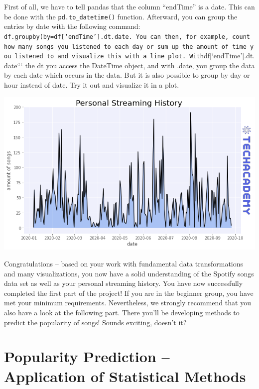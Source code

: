 \documentclass[
  11pt,
]{book}
\newenvironment{tipsp}[1]
  {
  \begin{itemize}
  \footnotesize
  \renewcommand{\labelitemi}{
    \raisebox{-.7\height}[0pt][0pt]{
      {\setkeys{Gin}{width=3em,keepaspectratio}
        \texttt{[image: images/\#1.png]}}
    }
  }
  \setlength{\fboxsep}{1em}
  \begin{pbox}
  \item
  }
  {
  \end{pbox}
  \end{itemize}
  }
\begin{document}
\begin{tipsp}p

First of all, we have to tell pandas that the column ``endTime'' is a date. This can be done with the \texttt{pd.to\_datetime()} function.
Afterward, you can group the entries by date with the following command:
\texttt{df.groupby(by=df{[}‘endTime’{]}.dt.date\textasciigrave{}\textasciigrave{}\textasciigrave{}.\ You\ can\ then,\ for\ example,\ count\ how\ many\ songs\ you\ listened\ to\ each\ day\ or\ sum\ up\ the\ amount\ of\ time\ you\ listened\ to\ and\ visualize\ this\ with\ a\ line\ plot.\ With}df{[}`endTime'{]}.dt.date``` the dt you access the DateTime object, and with .date, you group the data by each date which occurs in the data. But it is also possible to group by day or hour instead of date.
Try it out and visualize it in a plot.

\end{tipsp}

\begin{center}\includegraphics[width=1\linewidth]{splots/personal_streaming} \end{center}

Congratulations -- based on your work with fundamental data transformations and many visualizations, you now have a solid understanding of the Spotify songs data set as well as your personal streaming history. You have now successfully completed the first part of the project! If you are in the beginner group, you have met your minimum requirements. Nevertheless, we strongly recommend that you also have a look at the following part. There you'll be developing methods to predict the popularity of songs! Sounds exciting, doesn't it?

\newpage

\hypertarget{popularity-prediction-application-of-statistical-methods}{%
\chapter{Popularity Prediction -- Application of Statistical Methods}\label{popularity-prediction-application-of-statistical-methods}}
\end{document}
